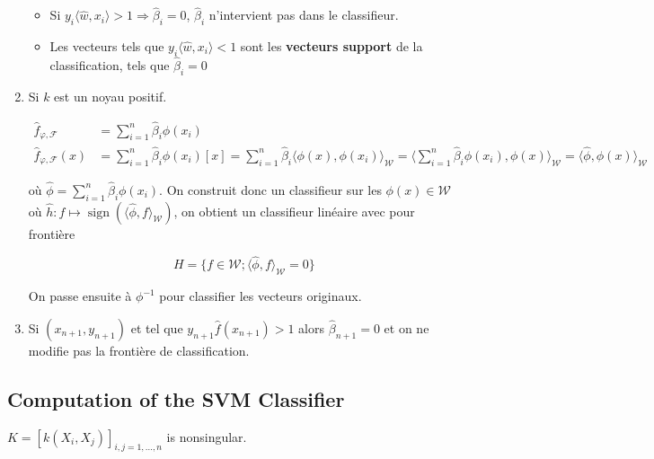 \documentclass[10pt,a4paper,oneside]{article}
\DeclareMathOperator{\sign}{sign}
\begin{document}
\begin{enumerate}
\begin{itemize}
\item
Si $y_i \langle \hat{w},x_i \rangle > 1 \Rightarrow \hat{\beta}_i = 0$, $\hat{\beta}_i$ n'intervient pas dans le classifieur.
\item
Les vecteurs tels que $y_i \langle \hat{w},x_i \rangle < 1$ sont les \textbf{vecteurs support} de la classification, tels que $\hat{\beta}_i = 0$
\end{itemize}

\item
Si $k$ est un noyau positif.

\begin{align*}
\hat{f}_{\varphi, \mathcal{F}} &= \sum_{i = 1}^n \hat{\beta}_i \phi(x_i) \\
\hat{f}_{\varphi, \mathcal{F}}(x) &= \sum_{i = 1}^n \hat{\beta}_i \phi(x_i)[x] = \sum_{i = 1}^n \hat{\beta}_i \langle \phi(x), \phi(x_i) \rangle_\mathcal{W} = \langle \sum_{i = 1}^n \hat{\beta}_i \phi(x_i), \phi(x) \rangle_\mathcal{W} = \langle \hat{\phi}, \phi(x) \rangle_\mathcal{W}
\end{align*}

où $\hat{\phi} = \sum_{i = 1}^n \hat{\beta}_i \phi(x_i)$. On construit donc un classifieur sur les $\phi(x) \in \mathcal{W}$ où $\hat{h} : f \mapsto \sign(\langle \hat{\phi}, f \rangle_\mathcal{W})$, on obtient un classifieur linéaire avec pour frontière

\[ H = \{ f \in \mathcal{W} ; \langle \hat{\phi}, f \rangle_\mathcal{W} = 0 \} \]

On passe ensuite à $\phi^{-1}$ pour classifier les vecteurs originaux.

\item
Si $(x_{n + 1},y_{n + 1})$ et tel que $y_{n + 1} \hat{f}(x_{n + 1}) > 1$ alors $\hat{\beta}_{n + 1} = 0$ et on ne modifie pas la frontière de classification.
\end{enumerate}

\subsection{Computation of the SVM Classifier}

$K = [k(X_i, X_j)]_{i,j = 1,\ldots,n}$ is nonsingular.
\end{document}
